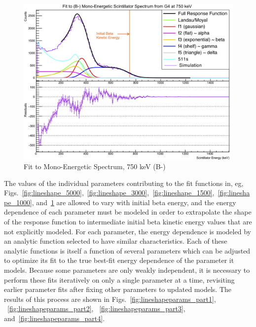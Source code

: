 \begin{figure}[h!!tb]
	\centering
	\includegraphics[width=.999\linewidth]
	{Figures/MonoFit_750.png}
	\caption[Fit to Mono-Energetic Spectrum, 750 keV]{Fit to Mono-Energetic Spectrum, 750 keV (B-)}	
	\label{fig:lineshape_750}
\end{figure}

The values of the individual parameters contributing to the fit functions in, eg, Figs.~\ref{fig:lineshape_5000},~\ref{fig:lineshape_3000},~\ref{fig:lineshape_1500},~\ref{fig:lineshape_1000}, and~\ref{fig:lineshape_750} are allowed to vary with initial beta energy, and the energy dependence of each parameter must be modeled in order to extrapolate the shape of the response function to intermediate initial beta kinetic energy values that are not explicitly modeled.  For each parameter, the energy dependence is modeled by an analytic function selected to have similar characteristics.  Each of these analytic functions is itself a function of several parameters which can be adjusted to optimize its fit to the true best-fit energy dependence of the parameter it models.  Because some parameters are only weakly independent, it is necessary to perform these fits iteratively on only a single parameter at a time, revisiting earlier parameter fits after fixing other parameters to updated models.  The results of this process are shown in Figs.~\ref{fig:lineshapeparams_part1}, ~\ref{fig:lineshapeparams_part2}, ~\ref{fig:lineshapeparams_part3}, and~\ref{fig:lineshapeparams_part4}.

